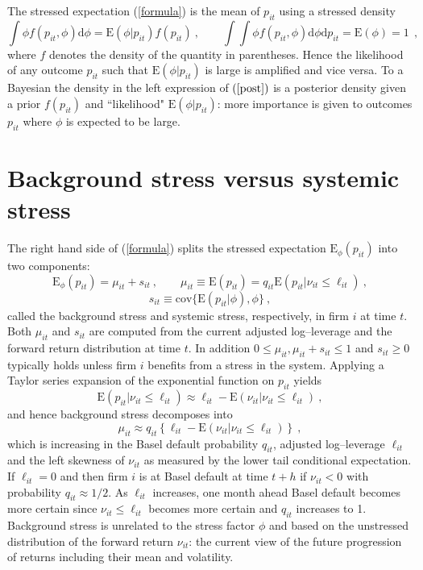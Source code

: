 \documentclass[12pt]{article}
\newcommand{\E}{\mathrm{E}}
\newcommand{\cov}{\mathrm{cov}}
\newcommand{\Es}{\E_\phi}
\newcommand{\de}{\mathrm{d}}
\newcommand{\eref}[1]{(\ref{#1})}
\newcommand{\cq}{\ , \qquad}
\newcommand{\be}[1]{\begin{equation}\label{#1}}
\newcommand{\ee}{\end{equation}}
\begin{document}
The stressed expectation \eref{formula}  is the mean of $p_{it}$  using a stressed density
\be{post}
\int \phi f(p_{it},\phi)\de \phi= \E(\phi|p_{it})f(p_{it})\cq \int\int \phi f(p_{it},\phi)\de \phi\de p_{it} = \E(\phi) = 1\
\  ,
\ee
where $f$ denotes the density of the quantity in parentheses.
Hence the likelihood of any outcome $p_{it}$ such that $\E(\phi|p_{it})$ is large is amplified and vice versa.   To a Bayesian the density in the left  expression of $\eref{post}$ is a posterior density given a prior $f(p_{it})$ and ``likelihood" $\E(\phi|p_{it})$: more importance is given to outcomes   $p_{it}$  where $\phi$ is expected to be large.



\section{Background stress versus systemic stress}


The right hand side of \eref{formula} splits the stressed expectation $\Es(p_{it})$ into two components:
\be{vsstress}
\Es(p_{it}) =\mu_{it}+s_{it}\cq
 \mu_{it} \equiv \E(p_{it})=q_{it}\E(p_{it}|\nu_{it}\le \ell_{it}) \ ,
\ee
$$
s_{it} \equiv \cov\{\E(p_{it}|\phi),\phi\}\ ,
$$
called  the background stress  and systemic stress, respectively, in firm $i$ at time $t$. Both $\mu_{it}$ and $s_{it}$ are computed from the current adjusted log--leverage and the forward return distribution at time $t$. In addition $0\le \mu_{it},\mu_{it}+s_{it}\le 1$ and $s_{it}\ge 0$ typically holds unless firm $i$ benefits from a stress in the system. Applying a Taylor series expansion of the exponential function on $p_{it}$ yields
$$
\E(p_{it}|\nu_{it}\le \ell_{it}) \approx \ell_{it}-\E(\nu_{it}|\nu_{it}\le \ell_{it})\ ,
$$
and hence background stress decomposes into
$$
\mu_{it} \approx q_{it} \left\{\ell_{it} - \E(\nu_{it}|\nu_{it}\le \ell_{it})\right\} \ ,
$$
which is increasing in the Basel default probability $q_{it}$, adjusted log--leverage $\ell_{it}$ and the left skewness of $\nu_{it}$ as measured by the lower tail conditional expectation. If $\ell_{it}=0$  and then firm $i$ is at Basel default at time $t+h$ if  $\nu_{it}<0$ with probability $q_{it}\approx 1/2$. As  $\ell_{it}$ increases,  one month ahead Basel default becomes more certain since $\nu_{it}\le \ell_{it}$ becomes more certain and $q_{it}$ increases to 1. Background stress is unrelated to the stress factor $\phi$ and based on the unstressed distribution of the forward return $\nu_{it}$: the current view of the future progression of returns including their mean and volatility.
\end{document}
